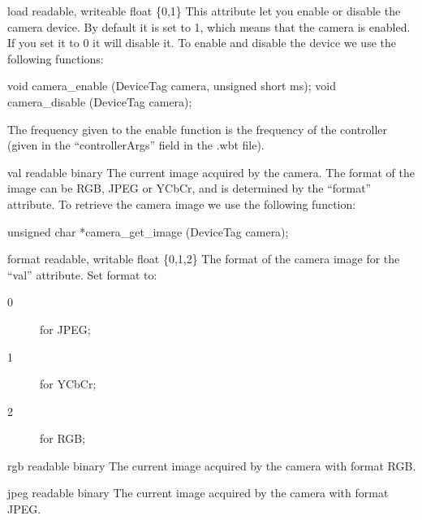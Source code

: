 \noindent
\begin{itemize}
\begin{attribute}{load}
  {readable, writeable}
  {float}
  {\{0,1\}}
  This attribute let you enable or disable the camera
  device.  By default it is set to 1, which means that the camera is
  enabled. If you set it to 0 it will disable it.  To enable and
  disable the device we use the following \webots functions:

\begin{cxx}
void camera_enable (DeviceTag camera, unsigned short ms);
void camera_disable (DeviceTag camera);
\end{cxx}

The frequency given to the enable function is the frequency of the
\urbi controller (given in the ``controllerArgs'' field in the .wbt
file).
\end{attribute}

\begin{attribute}{val}
  {readable}
  {binary}
  {}
  The current image acquired by the camera. The format of
  the image can be RGB, JPEG or YCbCr, and is determined by the
  ``format'' attribute.  To retrieve the camera image we use the
  following \webots function:


\begin{cxx}
unsigned char *camera_get_image (DeviceTag camera);
\end{cxx}
\end{attribute}

\begin{attribute}{format}
  {readable, writable}
  {float}
  {\{0,1,2\}}
  The format of the camera image for the ``val''
  attribute. Set format to:

  \begin{description}
  \item[0] for JPEG;
  \item[1] for YCbCr;
  \item[2] for RGB;
  \end{description}
\end{attribute}

\begin{attribute}{rgb}
  {readable}
  {binary}
  {}
  The current image acquired by the camera with format RGB.
\end{attribute}

\begin{attribute}{jpeg}
  {readable}
  {binary}
  {}
  The current image acquired by the camera with format JPEG.
\end{attribute}


\end{itemize}
